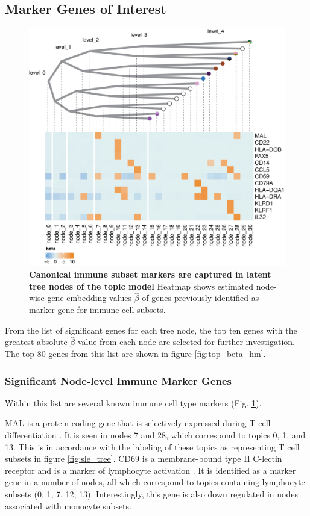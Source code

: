 \subsection{Marker Genes of Interest}
\begin{figure}
    \centering
    \includegraphics[width=\textwidth]{Figures/markers.png}
    \caption{\textbf{Canonical immune subset markers are captured in latent tree nodes of the topic model} Heatmap shows estimated node-wise gene embedding values $\hat{\beta}$ of genes previously identified as marker gene for immune cell subsets.}
    \label{fig:marker_genes}
\end{figure}

From the list of significant genes for each tree node, the top ten genes with the greatest absolute $\hat{\beta}$ value from each node are selected for further investigation. The top 80 genes from this list are shown in figure \ref{fig:top_beta_hm}.

\subsubsection{Significant Node-level Immune Marker Genes}
Within this list are several known immune cell type markers (Fig. \ref{fig:marker_genes}). 

MAL is a protein coding gene that is selectively expressed during T cell differentiation \cite{alonso1987cdna}. It is seen in  nodes 7 and 28, which correspond to topics 0, 1, and 13. This is in accordance with the labeling of these topics as representing T cell subsets in figure \ref{fig:sle_tree}. CD69 is a membrane-bound type II C-lectin receptor and is a marker of lymphocyte activation \cite{cibrian2017cd69}. It is identified as a marker gene in a number of nodes, all which correspond to topics containing lymphocyte subsets (0, 1, 7, 12, 13). Interestingly, this gene is also down regulated in nodes associated with monocyte subsets.

